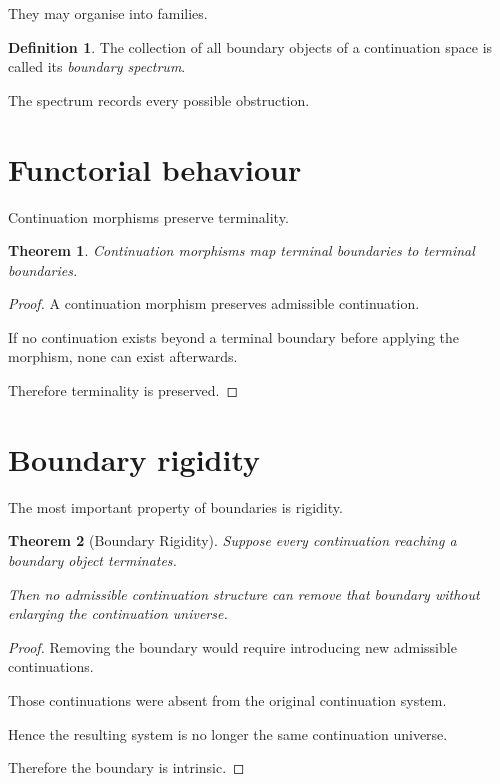 \documentclass[13pt,openany]{book}
\theoremstyle{plain}
\newtheorem{theorem}{Theorem}[chapter]
\theoremstyle{definition}
\newtheorem{definition}{Definition}[chapter]
\begin{document}
They may organise into families.

\begin{definition}
The collection of all boundary objects of a continuation space is called its
\emph{boundary spectrum}.
\end{definition}

The spectrum records every possible obstruction.

\section{Functorial behaviour}

Continuation morphisms preserve terminality.

\begin{theorem}
Continuation morphisms map terminal boundaries to terminal boundaries.
\end{theorem}

\begin{proof}

A continuation morphism preserves admissible continuation.

If no continuation exists beyond a terminal boundary before applying the morphism, none can exist afterwards.

Therefore terminality is preserved.

\end{proof}

\section{Boundary rigidity}

The most important property of boundaries is rigidity.

\begin{theorem}[Boundary Rigidity]

Suppose every continuation reaching a boundary object terminates.

Then no admissible continuation structure can remove that boundary without enlarging the continuation universe.

\end{theorem}

\begin{proof}

Removing the boundary would require introducing new admissible continuations.

Those continuations were absent from the original continuation system.

Hence the resulting system is no longer the same continuation universe.

Therefore the boundary is intrinsic.

\end{proof}
\end{document}
